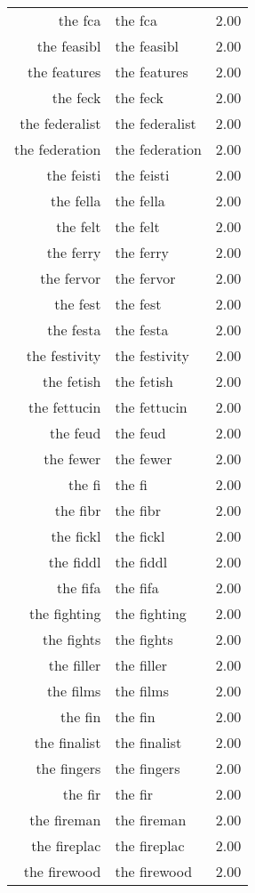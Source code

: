 \begin{table}[ht]
\begin{tabular}{rlr}
  the fca & the fca & 2.00 \\ 
  the feasibl & the feasibl & 2.00 \\ 
  the features & the features & 2.00 \\ 
  the feck & the feck & 2.00 \\ 
  the federalist & the federalist & 2.00 \\ 
  the federation & the federation & 2.00 \\ 
  the feisti & the feisti & 2.00 \\ 
  the fella & the fella & 2.00 \\ 
  the felt & the felt & 2.00 \\ 
  the ferry & the ferry & 2.00 \\ 
  the fervor & the fervor & 2.00 \\ 
  the fest & the fest & 2.00 \\ 
  the festa & the festa & 2.00 \\ 
  the festivity & the festivity & 2.00 \\ 
  the fetish & the fetish & 2.00 \\ 
  the fettucin & the fettucin & 2.00 \\ 
  the feud & the feud & 2.00 \\ 
  the fewer & the fewer & 2.00 \\ 
  the fi & the fi & 2.00 \\ 
  the fibr & the fibr & 2.00 \\ 
  the fickl & the fickl & 2.00 \\ 
  the fiddl & the fiddl & 2.00 \\ 
  the fifa & the fifa & 2.00 \\ 
  the fighting & the fighting & 2.00 \\ 
  the fights & the fights & 2.00 \\ 
  the filler & the filler & 2.00 \\ 
  the films & the films & 2.00 \\ 
  the fin & the fin & 2.00 \\ 
  the finalist & the finalist & 2.00 \\ 
  the fingers & the fingers & 2.00 \\ 
  the fir & the fir & 2.00 \\ 
  the fireman & the fireman & 2.00 \\ 
  the fireplac & the fireplac & 2.00 \\ 
  the firewood & the firewood & 2.00 \\ 

\end{tabular}
\end{table}
